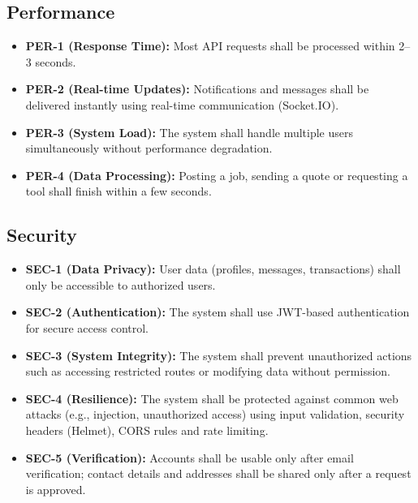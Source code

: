 \documentclass[A4paper,12pt]{report}
\theoremstyle{plain}
\theoremstyle{definition}
\theoremstyle{remark}
\numberwithin{equation}{section}
\begin{document}
\subsection{Performance}

\begin{itemize}
    \item \textbf{PER-1 (Response Time):} Most API requests shall be processed within 2–3 seconds.
    
    \item \textbf{PER-2 (Real-time Updates):} Notifications and messages shall be delivered instantly using real-time communication (Socket.IO).
    
    \item \textbf{PER-3 (System Load):} The system shall handle multiple users simultaneously without performance degradation.
    
    \item \textbf{PER-4 (Data Processing):} Posting a job, sending a quote or requesting a tool shall finish within a few seconds.
\end{itemize}

\subsection{Security}

\begin{itemize}
    \item \textbf{SEC-1 (Data Privacy):} User data (profiles, messages, transactions) shall only be accessible to authorized users.
    
    \item \textbf{SEC-2 (Authentication):} The system shall use JWT-based authentication for secure access control.
    
    \item \textbf{SEC-3 (System Integrity):} The system shall prevent unauthorized actions such as accessing restricted routes or modifying data without permission.
    
        \item \textbf{SEC-4 (Resilience):} The system shall be protected against common web attacks (e.g., injection, unauthorized access) using input validation, security headers (Helmet), CORS rules and rate limiting.
    \item \textbf{SEC-5 (Verification):} Accounts shall be usable only after email verification; contact details and addresses shall be shared only after a request is approved.
\end{itemize}
\end{document}
